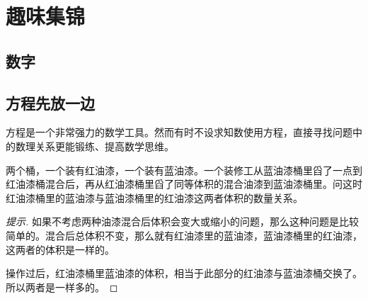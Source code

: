 
\chapter{趣味集锦}
\label{chap:fun}

\section{数字}
\label{sec:fun-number}


\section{方程先放一边}
\label{sec:leave-equation-alone}

方程是一个非常强力的数学工具。然而有时不设求知数使用方程，直接寻找问题中的数理关系更能锻练、提高数学思维。

\begin{example}
  两个桶，一个装有红油漆，一个装有蓝油漆。一个装修工从蓝油漆桶里舀了一点到红油漆桶混合后，再从红油漆桶里舀了同等体积的混合油漆到蓝油漆桶里。问这时红油漆桶里的蓝油漆与蓝油漆桶里的红油漆这两者体积的数量关系。
\end{example}
\begin{proof}[提示]
  如果不考虑两种油漆混合后体积会变大或缩小的问题，那么这种问题是比较简单的。混合后总体积不变，那么就有红油漆里的蓝油漆，蓝油漆桶里的红油漆，这两者的体积是一样的。


  操作过后，红油漆桶里蓝油漆的体积，相当于此部分的红油漆与蓝油漆桶交换了。所以两者是一样多的。
\end{proof}

